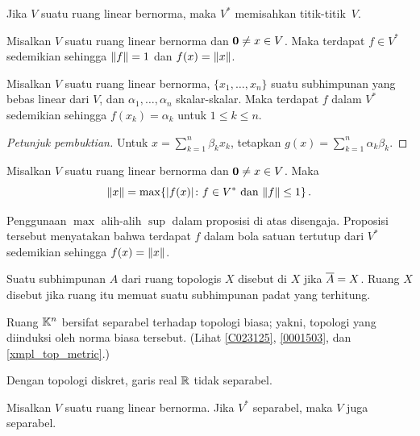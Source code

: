 \begin{cor}\label{HBCorII} Jika $V$ suatu ruang linear bernorma, maka $V^*$ memisahkan titik-titik~$V$.
\end{cor}

\begin{cor}\label{HBCorIII} Misalkan $V$ suatu ruang linear bernorma dan $\mathbf{0} \ne x \in V$. Maka terdapat
$f \in V^*$ sedemikian sehingga $\lVert f\rVert = 1$ dan $f(x) = \lVert x\rVert$.
\end{cor}

\begin{prop} Misalkan $V$ suatu ruang linear bernorma, $\{x_1,\dots,x_n\}$ suatu subhimpunan yang bebas linear
dari $V$, dan $\alpha_1, \dots, \alpha_n$ skalar-skalar. Maka terdapat $f$ dalam
$V^*$ sedemikian sehingga $f(x_k) = \alpha_k$ untuk $1\le k \le n$.
\end{prop}

\begin{proof}[\emph{Petunjuk pembuktian}] Untuk $x = \sum_{k=1}^n \beta_k x_k$, tetapkan $g(x) =
\sum_{k=1}^n \alpha_k \beta_k$. \ns
\end{proof}

\begin{prop}\label{C067131} Misalkan $V$ suatu ruang linear bernorma dan $\mathbf{0} \ne x \in V$. Maka
   \[ \lVert x\rVert = \max\{\lvert f(x)\rvert\colon f \in V^* \text{ dan } \lVert f\rVert \le 1\}\,. \]
\end{prop}

Penggunaan $\max$ alih-alih $\sup$ dalam proposisi di atas disengaja. Proposisi tersebut menyatakan bahwa
terdapat $f$ dalam bola satuan tertutup dari $V^*$ sedemikian sehingga $f(x) = \lVert x\rVert$.

\begin{defn} Suatu subhimpunan $A$ dari ruang topologis $X$ disebut
 di $X$ jika $\overline{A} = X$. Ruang $X$ disebut
 jika ruang itu memuat suatu subhimpunan padat yang terhitung.
\end{defn}

\begin{exam} Ruang $\mathbb{K}^n$ bersifat separabel terhadap topologi biasa; yakni,
topologi yang diinduksi oleh norma biasa tersebut. (Lihat \ref{C023125}, \ref{0001503}, dan \ref{xmpl_top_metric}.)
\end{exam}

\begin{exam} Dengan topologi diskret, garis real $\mathbb{R}$ tidak separabel.
\end{exam}

\begin{prop} Misalkan $V$ suatu ruang linear bernorma. Jika $V^*$ separabel, maka $V$ juga separabel.
\end{prop}




















\endinput
